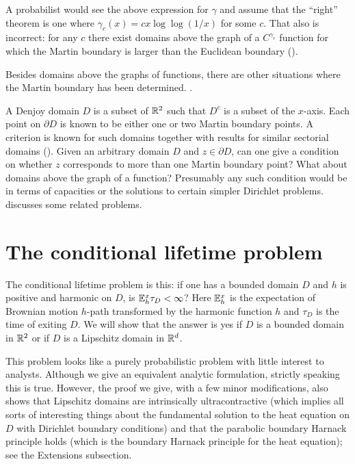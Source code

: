 A probabilist would see the above expression for $\gamma$ and assume that the ``right'' theorem is one where $\gamma_c(x) = cx\log\log(1/x)$ for some $c$. That also is incorrect: for any $c$ there exist domains above the graph of a $C^{\gamma_c}$ function for which the Martin boundary is larger than the Euclidean boundary (\cite{BassBurdzy1993}).

Besides domains above the graphs of functions, there are other situations where the Martin boundary has been determined. \cite[See][]{Ancona1987}.

\mpagebreak

A Denjoy domain $D$ is a subset of $\mathbb{R}^2$ such that $D^c$ is a subset of the $x$-axis. Each point on $\partial D$ is known to be either one or two Martin boundary points. A criterion is known for such domains together with results for similar sectorial domains (\cite{CranstonSalisbury1993}). Given an arbitrary domain $D$ and $z \in \partial D$, can one give a condition on whether $z$ corresponds to more than one Martin boundary point? What about domains above the graph of a function? Presumably any such condition would be in terms of capacities or the solutions to certain simpler Dirichlet problems. \cite{Bishop1992} discusses some related problems.

\section{The conditional lifetime problem}\label{ch3_sec3}


The conditional lifetime problem is this: if one has a bounded domain $D$ and $h$ is positive and harmonic on $D$, is $\mathbb{E}_h^x\tau_D < \infty$? Here $\mathbb{E}_h^x$ is the expectation of Brownian motion $h$-path transformed by the harmonic function $h$ and $\tau_D$ is the time of exiting $D$. We will show that the answer is yes if $D$ is a bounded domain in $\mathbb{R}^2$ or if $D$ is a Lipschitz domain in $\mathbb{R}^d$.

This problem looks like a purely probabilistic problem with little interest to analysts. Although we give an equivalent analytic formulation, strictly speaking this is true. However, the proof we give, with a few minor modifications, also shows that Lipschitz domains are intrinsically ultracontractive (which implies all sorts of interesting things about the fundamental solution to the heat equation on $D$ with Dirichlet boundary conditions) and that the parabolic boundary Harnack principle holds (which is the boundary Harnack principle for the heat equation); see the Extensions subsection.

